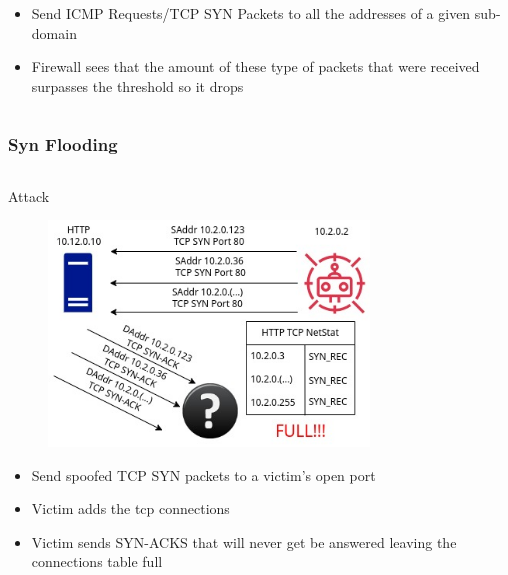 \documentclass{beamer}
\begin{document}
\begin{frame}
\begin{columns}
\begin{column}{0.5\textwidth}
\begin{figure}
        \end{figure}
            \begin{itemize}[label={}]
                \item \footnotesize Send ICMP Requests/TCP SYN Packets to all the addresses of a given sub-domain
                \item \footnotesize Firewall sees that the amount of these type of packets that were received surpasses the threshold so it drops
            \end{itemize}
    \end{column}
\end{columns}
\end{frame}

\begin{frame}
\frametitle{Syn Flooding}
\begin{columns}
    \begin{column}{0.5\textwidth}
        \Large Attack
        \begin{figure}
            \centering
            \includegraphics[width=0.8\textwidth]{flood_attack.jpg}\\
        \end{figure}
            \begin{itemize}[label={}]
                \item \footnotesize Send spoofed TCP SYN packets to a victim's open port
                \item \footnotesize Victim adds the tcp connections
                \item \footnotesize Victim sends SYN-ACKS that will never get be answered leaving the connections table full
            \end{itemize}
    \end{column}
    \begin{column}{0.5\textwidth}

\end{column}
\end{columns}
\end{frame}
\end{document}
